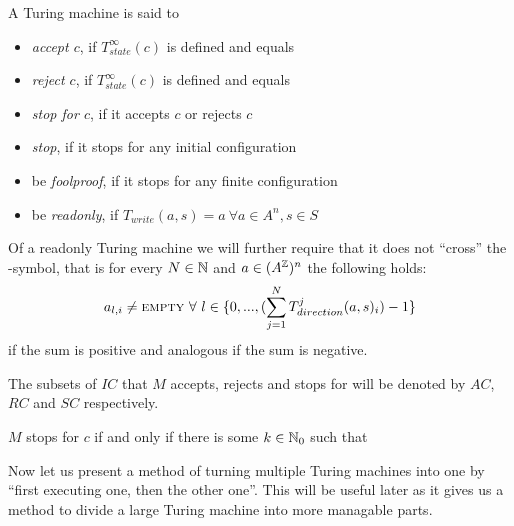 A Turing machine is said to
\begin{itemize}
	\item{\emph{accept $c$}, if $T_{state}^\infty(c)$ is defined and equals \ACC}
	\item{\emph{reject $c$}, if $T_{state}^\infty(c)$ is defined and equals \REJ}
	\item{\emph{stop for $c$}, if it accepts $c$ or rejects $c$}
	\item{\emph{stop}, if it stops for any initial configuration}
	\item{be \emph{foolproof}, if it stops for any finite configuration}
	\item{be \emph{readonly}, if $T_{write}(a,s) = a~\forall a \in A^n, s \in S$}
\end{itemize}
Of a readonly Turing machine we will further require that it does not ``cross'' the \EMP-symbol, that is for every $N \in \mathbb{N}$ and $a \in (A^{\mathbb{Z}})^n$ the following holds:
\begin{align*}
	a_{l,i} \neq \text{\scshape{empty}}~\forall~l \in \{0,...,(\sum_{j=1}^N T_{direction}^j(a,s)_i) -1\}
\end{align*}
if the sum is positive and analogous if the sum is negative.

The subsets of $IC$ that $M$ accepts, rejects and stops for will be denoted by $AC$, $RC$ and $SC$ respectively.

\remark $M$ stops for $c$ if and only if there is some $k \in \mathbb{N}_0$ such that 

Now let us present a method of turning multiple Turing machines into one by ``first executing one, then the other one''. This will be useful later as it gives us a method to divide a large Turing machine into more managable parts.

